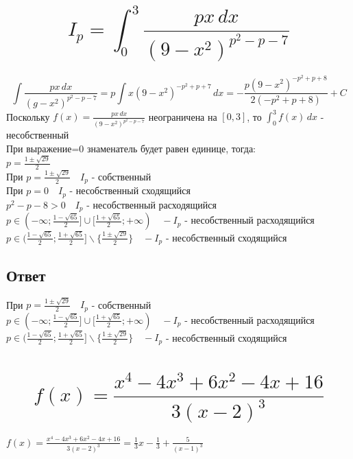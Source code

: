 \documentclass{article}
\begin{document}
    \section{
    \begin{equation*}
    I_p = \int_{0}^3 \frac{px \, dx}{(9-x^2)^{p^2-p-7}}
    \end{equation*}
    }
    \begin{equation*}
    \int\frac{px \, dx}{(g-x^{2})^{p^2-p-7}} = p\int x(9-x^{2})^{-p^2+p+7} \, dx = -\frac{p(9-x^{2})^{-p^2+p+8}}{2(-p^{2}+p+8)} + C
    \end{equation*}
    Поскольку $f(x)= \frac{px \, dx}{(9-x^2)^{p^2-p-7}}$ неограничена на $[0 , 3]$, то $\int_{0}^3 f(x) \, dx$ - несобственный \\
    При выражение=0 знаменатель будет равен единице, тогда:\\
    $p = \frac{1 \pm \sqrt{29}}{2}$\\
    При $p = \frac{1 \pm \sqrt{29}}{2} \quad I_p$ - собственный\\
    При $p = 0 \quad I_p$ - несобственный сходящийся\\
    $p^2 - p - 8 > 0 \quad I_p$ - несобственный расходящийся\\
    $p \in (- \infty ; \frac{1 - \sqrt{65}}{2}] \cup [\frac{1 + \sqrt{65}}{2} ; + \infty) \quad - I_p$ - несобственный расходящийся\\
    $p \in (\frac{1 - \sqrt{65}}{2} ; \frac{1 + \sqrt{65}}{2}] \backslash \{\frac{1 \pm \sqrt{29}}{2}\} \quad - I_p$ - несобственный сходящийся\\
    \subsection{Ответ}
    При $p = \frac{1 \pm \sqrt{29}}{2} \quad I_p$ - собственный\\
    $p \in (- \infty ; \frac{1 - \sqrt{65}}{2}] \cup [\frac{1 + \sqrt{65}}{2} ; + \infty) \quad - I_p$ - несобственный расходящийся\\
    $p \in (\frac{1 - \sqrt{65}}{2} ; \frac{1 + \sqrt{65}}{2}] \backslash \{\frac{1 \pm \sqrt{29}}{2}\} \quad - I_p$ - несобственный сходящийся
    

\newpage
    \section{
    \begin{equation*}
    f(x) = \frac{x^4-4x^3+6x^2-4x+16}{3(x-2)^3}    
    \end{equation*}
    }
    $f(x) = \frac{x^4-4x^3+6x^2-4x+16}{3(x-2)^3} = \frac{1}{3}x -\frac{1}{3} + \frac{5}{(x-1)^3}$
\end{document}
